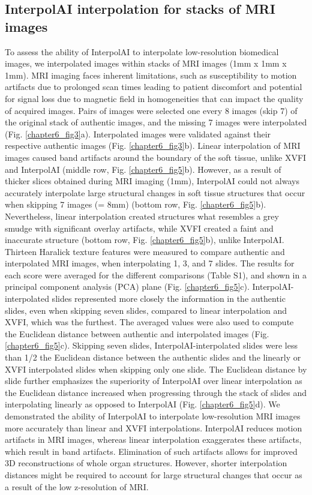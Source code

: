 \begin{refsection}
    \section{InterpolAI interpolation for stacks of MRI images}
    To assess the ability of InterpolAI to interpolate low-resolution biomedical images, we interpolated images within stacks of MRI images (1mm x 1mm x 1mm). MRI imaging faces inherent limitations, such as susceptibility to motion artifacts due to prolonged scan times leading to patient discomfort and potential for signal loss due to magnetic field in homogeneities that can impact the quality of acquired images. Pairs of images were selected one every 8 images (skip 7) of the original stack of authentic images, and the missing 7 images were interpolated (Fig. \ref{chapter6_fig3}a). Interpolated images were validated against their respective authentic images (Fig. \ref{chapter6_fig3}b).
    Linear interpolation of MRI images caused band artifacts around the boundary of the soft tissue, unlike XVFI and InterpolAI (middle row, Fig. \ref{chapter6_fig5}b). However, as a result of thicker slices obtained during MRI imaging (1mm), InterpolAI could not always accurately interpolate large structural changes in soft tissue structures that occur when skipping 7 images (= 8mm) (bottom row, Fig. \ref{chapter6_fig5}b). Nevertheless, linear interpolation created structures what resembles a grey smudge with significant overlay artifacts, while XVFI created a faint and inaccurate structure (bottom row, Fig. \ref{chapter6_fig5}b), unlike InterpolAI. 
    Thirteen Haralick texture features were measured to compare authentic and interpolated MRI images, when interpolating 1, 3, and 7 slides. The results for each score were averaged for the different comparisons (Table S1), and shown in a principal component analysis (PCA) plane (Fig. \ref{chapter6_fig5}c). InterpolAI-interpolated slides represented more closely the information in the authentic slides, even when skipping seven slides, compared to linear interpolation and XVFI, which was the furthest. The averaged values were also used to compute the Euclidean distance between authentic and interpolated images (Fig. \ref{chapter6_fig5}c). Skipping seven slides, InterpolAI-interpolated slides were less than 1/2 the Euclidean distance between the authentic slides and the linearly or XVFI interpolated slides when skipping only one slide. The Euclidean distance by slide further emphasizes the superiority of InterpolAI over linear interpolation as the Euclidean distance increased when progressing through the stack of slides and interpolating linearly as opposed to InterpolAI (Fig. \ref{chapter6_fig5}d). 
    We demonstrated the ability of InterpolAI to interpolate low-resolution MRI images more accurately than linear and XVFI interpolations. InterpolAI reduces motion artifacts in MRI images, whereas linear interpolation exaggerates these artifacts, which result in band artifacts. Elimination of such artifacts allows for improved 3D reconstructions of whole organ structures. However, shorter interpolation distances might be required to account for large structural changes that occur as a result of the low z-resolution of MRI.
    

\end{refsection}
